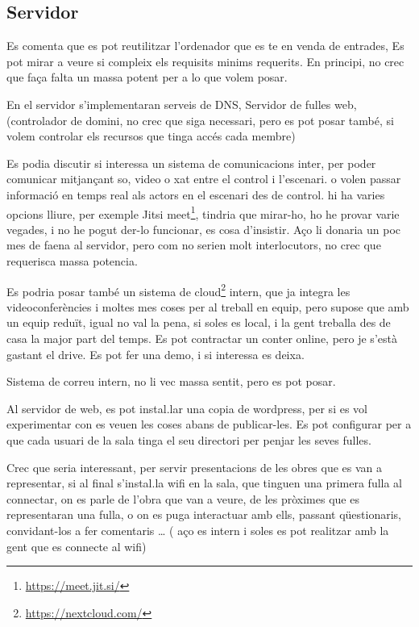 \documentclass[
  10pt,
]{book}
\DeclareRobustCommand{\href}[2]{#2\footnote{\url{#1}}}
\begin{document}
\hypertarget{servidor}{%
\subsection{Servidor}\label{servidor}}

Es comenta que es pot reutilitzar l'ordenador que es te en venda de entrades, Es pot mirar a veure si compleix els requisits minims requerits. En principi, no crec que faça falta un massa potent per a lo que volem posar.

En el servidor s'implementaran serveis de DNS, Servidor de fulles web, (controlador de domini, no crec que siga necessari, pero es pot posar també, si volem controlar els recursos que tinga accés cada membre)

Es podia discutir si interessa un sistema de comunicacions inter, per poder comunicar mitjançant so, video o xat entre el control i l'escenari. o volen passar informació en temps real als actors en el escenari des de control. hi ha varies opcions lliure, per exemple \href{https://meet.jit.si/}{Jitsi meet}, tindria que mirar-ho, ho he provar varie vegades, i no he pogut der-lo funcionar, es cosa d'insistir. Aço li donaria un poc mes de faena al servidor, pero com no serien molt interlocutors, no crec que requerisca massa potencia.

Es podria posar també un sistema de \href{https://nextcloud.com/}{cloud} intern, que ja integra les videoconferències i moltes mes coses per al treball en equip, pero supose que amb un equip reduït, igual no val la pena, si soles es local, i la gent treballa des de casa la major part del temps. Es pot contractar un conter online, pero je s'està gastant el drive. Es pot fer una demo, i si interessa es deixa.

Sistema de correu intern, no li vec massa sentit, pero es pot posar.

Al servidor de web, es pot instal.lar una copia de wordpress, per si es vol experimentar con es veuen les coses abans de publicar-les. Es pot configurar per a que cada usuari de la sala tinga el seu directori per penjar les seves fulles.

Crec que seria interessant, per servir presentacions de les obres que es van a representar, si al final s'instal.la wifi en la sala, que tinguen una primera fulla al connectar, on es parle de l'obra que van a veure, de les pròximes que es representaran una fulla, o on es puga interactuar amb ells, passant qüestionaris, convidant-los a fer comentaris \ldots{} ( aço es intern i soles es pot realitzar amb la gent que es connecte al wifi)
\end{document}
